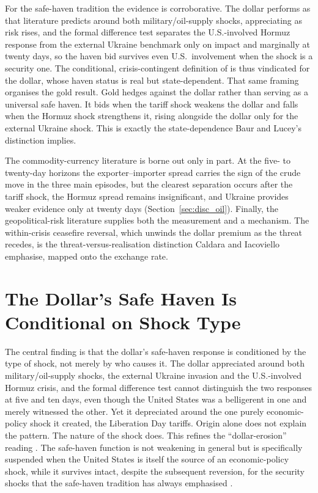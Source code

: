 For the safe-haven tradition \parencite{ranaldo_soderlind_2010,habib_stracca_2012,debock_decarvalhofilho_2015} the evidence
is corroborative. The dollar performs as that literature predicts around both
military/oil-supply shocks, appreciating as risk rises, and the formal difference test separates the U.S.-involved Hormuz response from the external Ukraine benchmark only on impact and marginally at twenty days, so the haven bid survives even U.S.\ involvement when the shock is a security one. The conditional,
crisis-contingent definition of \textcite{baur_lucey_2010} is thus vindicated for the dollar, whose
haven status is real but state-dependent. That same framing organises the gold
result. Gold hedges against the dollar rather than serving as a universal safe haven. It
bids when the tariff shock weakens the dollar and falls when the Hormuz shock strengthens it,
rising alongside the dollar only for the external Ukraine shock. This is exactly the state-dependence
Baur and Lucey's distinction implies.

The commodity-currency literature \parencite{chen_rogoff_2003,kilian_2009} is borne out only in part. At the five- to twenty-day horizons the exporter--importer spread carries the sign of the crude move in the three main episodes, but the clearest separation occurs after the tariff shock, the Hormuz spread remains insignificant, and Ukraine provides weaker evidence only at twenty days (Section~\ref{sec:disc_oil}). Finally, the geopolitical-risk literature
\parencite{caldara_iacoviello_2022} supplies both the measurement and a mechanism. The within-crisis
ceasefire reversal, which unwinds the dollar premium as the threat recedes, is the
threat-versus-realisation distinction Caldara and Iacoviello emphasise, mapped onto the
exchange rate.

\section{The Dollar's Safe Haven Is Conditional on Shock Type}
\label{sec:disc_hierarchy}

The central finding is that the dollar's safe-haven response is conditioned by the
type of shock, not merely by who causes it. The dollar appreciated around both
military/oil-supply shocks, the external Ukraine invasion and the U.S.-involved Hormuz
crisis, and the formal difference test cannot distinguish the two responses at five and ten days, even though the United States was a belligerent in one and merely witnessed the other. Yet it depreciated around the
one purely economic-policy shock it created, the Liberation Day tariffs. Origin alone does
not explain the pattern. The nature of the shock does. This refines the ``dollar-erosion''
reading \parencite{kamin_2025,jiang_krishnamurthy_lustig_richmond_2026}. The safe-haven function is not weakening in
general but is specifically suspended when the United States is itself the source of an
economic-policy shock, while it survives intact, despite the subsequent reversion, for the
security shocks that the safe-haven tradition has always emphasised
\parencite{ranaldo_soderlind_2010,habib_stracca_2012}.

